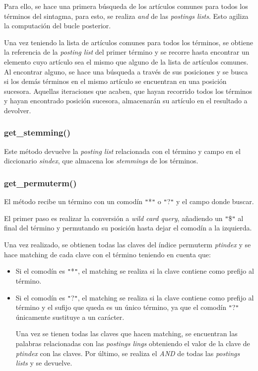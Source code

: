 \documentclass[12pt,a4paper]{article}
\begin{document}
Para ello, se hace una primera búsqueda de los artículos comunes para todos los términos del sintagma, para esto, se realiza \textit{and} de las \textit{postings lists}. Esto agiliza la computación del bucle posterior.

Una vez teniendo la lista de artículos comunes para todos los términos, se obtiene la referencia de la \textit{posting list} del primer término y se recorre hasta encontrar un elemento cuyo artículo sea el mismo que alguno de la lista de artículos comunes. Al encontrar alguno, se hace una búsqueda a través de sus posiciones y se busca si los demás términos en el mismo artículo se encuentran en una posición sucesora. Aquellas iteraciones que acaben, que hayan recorrido todos los términos y hayan encontrado posición sucesora, almacenarán su artículo en el resultado a devolver.
\subsubsection{get\_stemming()}
Este método devuelve la \textit{posting list} relacionada con el término y campo en el diccionario \textit{sindex}, que almacena los \textit{stemmings} de los términos.
\subsubsection{get\_permuterm()}
El método recibe un término con un comodín \texttt{"}*\texttt{"} o \texttt{"}?\texttt{"} y el campo donde buscar.

 El primer paso es realizar la conversión a \textit{wild card query}, añadiendo un \texttt{"}\$\texttt{"} al final del término y permutando su posición hasta dejar el comodín a la izquierda.

 Una vez realizado, se obtienen todas las claves del índice permuterm \textit{ptindex} y se hace matching de cada clave con el término teniendo en cuenta que:
 \begin{itemize}
\item Si el comodín es \texttt{"}*\texttt{"}, el matching se realiza si la clave contiene como prefijo al término.
\item Si el comodín es \texttt{"}?\texttt{"}, el matching se realiza si la clave contiene como prefijo al término y el sufijo que queda es un único término, ya que el comodín \texttt{"}?\texttt{"} únicamente sustituye a un carácter.

Una vez se tienen todas las claves que hacen matching, se encuentran las palabras relacionadas con las \textit{postings lings} obteniendo el valor de la clave de \textit{ptindex} con las claves. Por último, se realiza el \textit{AND} de todas las \textit{postings lists} y se devuelve.
\end{itemize}
\end{document}
